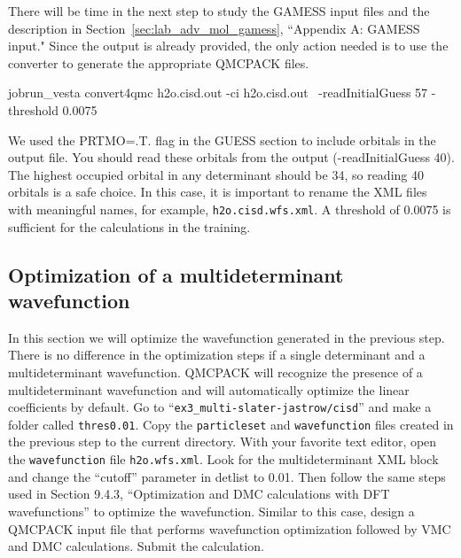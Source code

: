 
There will be time in the next step to study the GAMESS input
files and the description in Section~\ref{sec:lab_adv_mol_gamess}, ``Appendix A: GAMESS input." %
Since the output is already provided, the
only action needed is to use the converter to generate the appropriate QMCPACK files.  %
\begin{shade}
jobrun_vesta convert4qmc h2o.cisd.out -ci h2o.cisd.out \
-readInitialGuess 57 -threshold 0.0075
\end{shade}

We used the PRTMO=.T. flag in the GUESS section to include orbitals in the output file. You should read these orbitals from the output (-readInitialGuess 40).
The highest occupied orbital in any determinant should be 34, so reading 40 orbitals is a safe choice. In this case, it is important to rename the XML files with meaningful names, for example, \texttt{h2o.cisd.wfs.xml}. A threshold of 0.0075 is sufficient for the calculations in the training.


\subsection{Optimization of a multideterminant wavefunction}

In this section we will optimize the wavefunction generated in the previous step. There
is no difference in the optimization steps if a single determinant and a multideterminant wavefunction.
QMCPACK will recognize the presence of a multideterminant wavefunction and will automatically 
optimize the linear coefficients by default. Go to ``\texttt{ex3\_multi-slater-jastrow/cisd}'' and make a folder called 
\texttt{thres0.01}. Copy the \texttt{particleset} and \texttt{wavefunction} files created in the previous step to the current 
directory. With your favorite text editor, open the \texttt{wavefunction} file \texttt{h2o.wfs.xml}. Look for 
the multideterminant XML block and change the ``cutoff'' parameter in detlist to 0.01. Then follow 
the same steps used in Section 9.4.3, ``Optimization and DMC calculations with DFT wavefunctions''
to optimize the wavefunction. Similar to this case, design a QMCPACK input file that performs
wavefunction optimization followed by VMC and DMC calculations. Submit the calculation.

